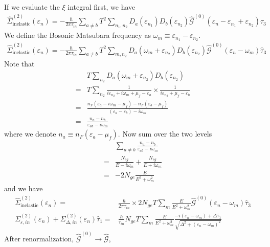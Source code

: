 \documentclass[]{article}
\begin{document}
If we evaluate the $\xi$ integral first, we have
\begin{align}
    \widehat{\Sigma}^{(2)}_\text{inelastic}(\varepsilon_n)
    = -\frac{\hbar}{2\pi\tau_{in}}\sum_{a\neq b}T^2\sum_{n_1,n_2}D_a(\varepsilon_{n_1})D_b(\varepsilon_{n_2})
    \widehat{\mathcal{G}}^{(0)}(\varepsilon_n-\varepsilon_{n_1}+\varepsilon_{n_2})\widehat{\tau}_3
\end{align}
We define the Bosonic Matsubara frequency as $\omega_m \equiv \varepsilon_{n_1}-\varepsilon_{n_2}$.
\begin{align}
    \widehat{\Sigma}^{(2)}_\text{inelastic}(\varepsilon_n)
    = -\frac{\hbar}{2\pi\tau_{in}}\sum_{a\neq b}T^2\sum_{m,n_2}D_a(\omega_m+\varepsilon_{n_2})D_b(\varepsilon_{n_2})
    \widehat{\mathcal{G}}^{(0)}(\varepsilon_n-\omega_m)\widehat{\tau}_3
\end{align}
Note that
\begin{align}
    &T\sum_{n_2}D_a(\omega_m+\varepsilon_{n_2})D_b(\varepsilon_{n_2}) \\
    = &T\sum_{n_2}\frac{1}{i\varepsilon_{n_2}+i\omega_m+\mu_f-\varepsilon_a}\times\frac{1}{i\varepsilon_{n_2}+\mu_f-\varepsilon_b}\\
    = &\frac{n_F(\varepsilon_a-i\omega_m-\mu_f)-n_F(\varepsilon_b-\mu_f)}{(\varepsilon_a-\varepsilon_b)-i\omega_m}\\
    = &\frac{n_a-n_b}{\varepsilon_{ab}-i\omega_m}
\end{align}
where we denote $n_a\equiv n_F(\varepsilon_a-\mu_f)$. Now sum over the two levels
\begin{align}
    &\sum_{a\neq b}\frac{n_a-n_b}{\varepsilon_{ab}-i\omega_m} \\
    =&\frac{N_{eg}}{E-i\omega_m} + \frac{N_{eg}}{E+i\omega_m} \\
    =&-2N_{ge}\frac{E}{E^2+\omega_m^2}
\end{align}
and we have
\begin{align}
    \widehat{\Sigma}^{(2)}_\text{inelastic}(\varepsilon_n)
    = & \frac{\hbar}{2\pi\tau_{in}}\times2N_{ge}T\sum_{m}\frac{E}{E^2+\omega_m^2}\widehat{\mathcal{G}}^{(0)}(\varepsilon_n-\omega_m)\widehat{\tau}_3\\
    \Sigma_{\varepsilon,in}^{(2)}(\varepsilon_n) + \Sigma_{\Delta,in}^{(2)}(\varepsilon_n)\widehat{\tau}_1
    = & \frac{\hbar}{\tau_{in}}N_{ge}T\sum_{m}\frac{E}{E^2+\omega_m^2}
    \frac{-i(\varepsilon_n-\omega_m) + \Delta\widehat{\tau}_1}{\sqrt{\Delta^2 + (\varepsilon_n-\omega_m)^2}}
\end{align}
After renormalization, $\widehat{\mathcal{G}}^{(0)} \rightarrow \widehat{\mathcal{G}}$,
\end{document}
